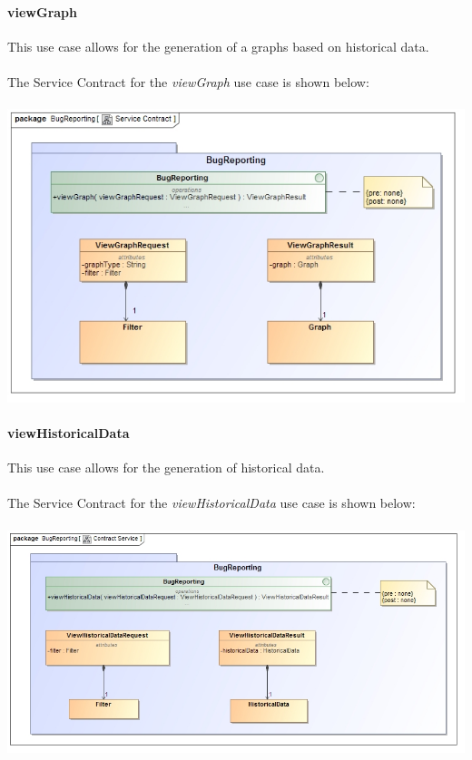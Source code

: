 \documentclass[11pt,a4paper,titlepage]{article}
\begin{document}
		\paragraph{viewGraph }
		This use case allows for the generation of a graphs based on historical data.\\\hfill\\
		The Service Contract for the \textit{viewGraph} use case is shown below:\\\hfill\\	
		\includegraphics[width=\linewidth]{viewGraphSC}	
		
		\paragraph{viewHistoricalData }
		This use case allows for the generation of historical data.\\\hfill\\
		The Service Contract for the \textit{viewHistoricalData} use case is shown below:\\\hfill\\
				\includegraphics[width=\linewidth]{viewHistoricalDataSC}	
\end{document}
